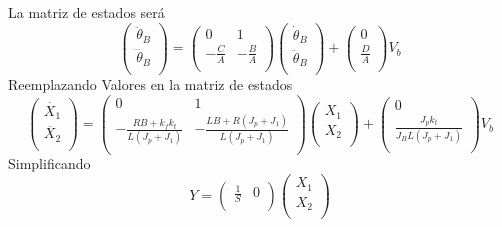 \documentclass[a4paper]{IEEEtran} %
\begin{document}
La matriz de estados será
\begin{equation}
    \begin{pmatrix}
        \ddot{\theta}_{B}\\
        \dddot{\theta}_{B}\\
    \end{pmatrix}
    =
    \begin{pmatrix}
    0&1\\
    -\frac{C}{A}&-\frac{B}{A}\\
    \end{pmatrix}
    \begin{pmatrix}
        \dot{\theta}_{B}\\
        \ddot{\theta}_{B}\\
    \end{pmatrix}
    +
    \begin{pmatrix}
        0\\
        \frac{D}{A}\\
    \end{pmatrix}
    V_{b}
    \label{eq:scattering}
\end{equation}
Reemplazando Valores en la matriz de estados
\begin{equation}
    \begin{pmatrix}
        \dot{X_{1}}\\
        \ddot{X_{2}}\\
    \end{pmatrix}
    =
    \begin{pmatrix}
    0&1\\
    -\frac{RB+k_{f}k_{t}}{L(J_{p}+J_{1})}&-\frac{LB+R(J_{p}+J_{1})}{L(J_{p}+J_{1})}\\
    \end{pmatrix}
    \begin{pmatrix}
        X_{1}\\
        X_{2}\\
    \end{pmatrix}
    +
    \begin{pmatrix}
        0\\
        \frac{J_{p}k_{t}}{J_{B}L(J_{p}+J_{1})}\\
    \end{pmatrix}
    V_{b}
    \label{eq:scattering}
\end{equation}
Simplificando
\begin{equation}
    Y=
    \begin{pmatrix}
        \frac{1}{S}&0\\
    \end{pmatrix}
    \begin{pmatrix}
        X_{1}\\
        X_{2}\\
    \end{pmatrix}
    \label{eq:scattering}
\end{equation}
\end{document}
